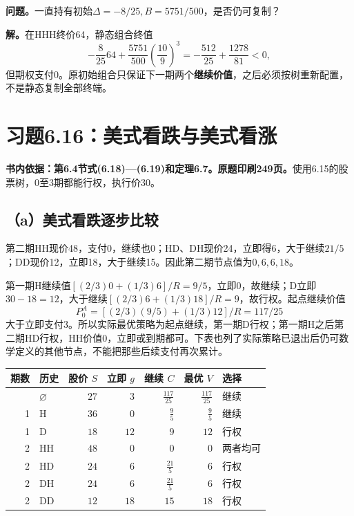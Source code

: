 \documentclass[11pt,a4paper,UTF8,fontset=fandol]{ctexart}
\begin{document}
\textbf{问题。}一直持有初始\(\Delta=-8/25,B=5751/500\)，是否仍可复制？

\textbf{解。}在HHH终价64，静态组合终值
\[-\frac8{25}64+\frac{5751}{500}\left(\frac{10}{9}\right)^3
=-\frac{512}{25}+\frac{1278}{81}<0,\]
但期权支付0。原初始组合只保证下一期两个\textbf{继续价值}，之后必须按树重新配置，不是静态复制全部终端。

\bigskip

\section{习题6.16：美式看跌与美式看涨}\label{ux4e60ux98986.16ux7f8eux5f0fux770bux8dccux4e0eux7f8eux5f0fux770bux6da8}

\textbf{书内依据：第6.4节式(6.18)---(6.19)和定理6.7。原题印刷249页。}使用6.15的股票树，0至3期都能行权，执行价30。

\subsection{（a）美式看跌逐步比较}\label{aux7f8eux5f0fux770bux8dccux9010ux6b65ux6bd4ux8f83}

第二期HH现价48，支付0，继续也0；HD、DH现价24，立即得6，大于继续\(21/5\)；DD现价12，立即18，大于继续15。因此第二期节点值为\(0,6,6,18\)。

第一期H继续值\([(2/3)0+(1/3)6]/R=9/5\)，立即0，故继续；D立即\(30-18=12\)，大于继续\([(2/3)6+(1/3)18]/R=9\)，故行权。起点继续价值
\[\boxed{P_0^A=[(2/3)(9/5)+(1/3)12]/R=117/25}\]
大于立即支付3。所以实际最优策略为起点继续，第一期D行权；第一期H之后第二期HD行权，HH价值0，立即或到期都可。下表也列了实际策略已退出后仍可数学定义的其他节点，不能把那些后续支付再次累计。

\begingroup
\small
\setlength{\tabcolsep}{4pt}
\renewcommand{\arraystretch}{1.10}

\begin{longtable}[]{@{}rlrrrrl@{}}
\toprule\noalign{}
期数 & 历史 & 股价 \(S\) & 立即 \(g\) & 继续 \(C\) & 最优 \(V\) &
选择 \\
\midrule\noalign{}
\endhead
\bottomrule\noalign{}
\endlastfoot
0 & \(\varnothing\) & \(27\) & \(3\) & \(\frac{117}{25}\) &
\(\frac{117}{25}\) & 继续 \\
1 & H & \(36\) & \(0\) & \(\frac{9}{5}\) & \(\frac{9}{5}\) & 继续 \\
1 & D & \(18\) & \(12\) & \(9\) & \(12\) & 行权 \\
2 & HH & \(48\) & \(0\) & \(0\) & \(0\) & 两者均可 \\
2 & HD & \(24\) & \(6\) & \(\frac{21}{5}\) & \(6\) & 行权 \\
2 & DH & \(24\) & \(6\) & \(\frac{21}{5}\) & \(6\) & 行权 \\
2 & DD & \(12\) & \(18\) & \(15\) & \(18\) & 行权 \\
\end{longtable}
\end{document}
